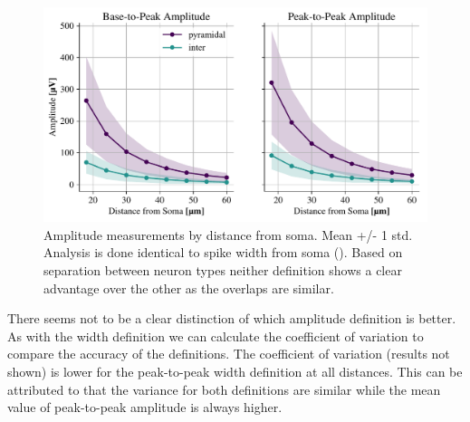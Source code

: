 \documentclass[altfont, fleqn]{uiophd}
\renewcommand{\cref}[1]{{\color{viridis_03}\mycref{#1}}}
\begin{document}
\begin{figure}[h]
    \begin{center}
        \includegraphics[width=\textwidth]{images/sec_4/int_pyr_amps_dist.pdf}
        \caption{
            Amplitude measurements by distance from soma. 
            Mean +/- 1 std.
            Analysis is done identical to spike width from soma (\cref{fig:4_width}). 
            Based on separation between neuron types
            neither definition shows a clear advantage over the other
            as the overlaps are similar. 
        }
        \label{fig:4_amp_distance}
    \end{center}
\end{figure}

There seems not to be a clear distinction of which amplitude definition is better. 
As with the width definition we can calculate the coefficient of variation 
to compare the accuracy of the definitions. 
The coefficient of variation (results not shown) 
is lower for the peak-to-peak width definition at all distances.  
This can be attributed to that the variance for both definitions are similar 
while the mean value of peak-to-peak amplitude is always higher. 

\newpage
\end{document}
